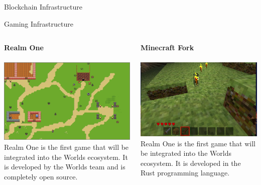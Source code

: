 \documentclass[aspectratio=169]{beamer}
\begin{document}
\begin{frame}{Blockchain Infrastructure}
\end{frame}

\begin{frame}{Gaming Infrastructure}
\begin{columns}
\begin{column}{0.5\textwidth}
    \centering
    \textbf{Realm One}
    \\~\\
    \includegraphics[scale=0.2]{realm.png}
    \justify
    Realm One is the first game that will be integrated into the Worlds
    ecosystem. It is developed by the Worlds team and is completely open
    source.

\end{column}
\begin{column}{0.5\textwidth}  %
    \centering
    \textbf{Minecraft Fork}
    \\~\\
    \includegraphics[scale=0.2]{minetest.png}
    \justify
    Realm One is the first game that will be integrated into the Worlds
    ecosystem. It is developed in the Rust programming language. 
\end{column}
\end{columns}
\end{frame}
\end{document}
